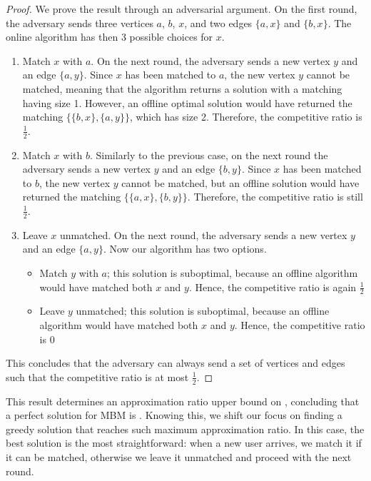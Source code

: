 \documentclass[a4paper, 12pt]{report}
\begin{document}
    \begin{proof}
        We prove the result through an adversarial argument. On the first round, the adversary sends three vertices $a$, $b$, $x$, and two edges $\{a, x\}$ and $\{b, x\}$. The online algorithm has then 3 possible choices for $x$.

        \begin{enumerate}
            \item Match $x$ with $a$. On the next round, the adversary sends a new vertex $y$ and an edge $\{a, y\}$. Since $x$ has been matched to $a$, the new vertex $y$ cannot be matched, meaning that the algorithm returns a solution with a matching having size 1. However, an offline optimal solution would have returned the matching $\{\{b, x\}, \{a, y\}\}$, which has size 2. Therefore, the competitive ratio is $\tfrac{1}{2}$.
            \item Match $x$ with $b$. Similarly to the previous case, on the next round the adversary sends a new vertex $y$ and an edge $\{b, y\}$. Since $x$ has been matched to $b$, the new vertex $y$ cannot be matched, but an offline solution would have returned the matching $\{\{a, x\}, \{b, y\}\}$. Therefore, the competitive ratio is still $\tfrac{1}{2}$.
            \item Leave $x$ unmatched. On the next round, the adversary sends a new vertex $y$ and an edge $\{a, y\}$. Now our algorithm has two options.

                \begin{itemize}
                    \item Match $y$ with $a$; this solution is suboptimal, because an offline algorithm would have matched both $x$ and $y$. Hence, the competitive ratio is again $\tfrac{1}{2}$
                    \item Leave $y$ unmatched; this solution is suboptimal, because an offline algorithm would have matched both $x$ and $y$. Hence, the competitive ratio is 0
                \end{itemize}
        \end{enumerate}

        This concludes that the adversary can always send a set of vertices and edges such that the competitive ratio is at most $\tfrac{1}{2}$.
    \end{proof}

    This result determines an approximation ratio upper bound on , concluding that a perfect solution for MBM is . Knowing this, we shift our focus on finding a greedy solution that reaches such maximum approximation ratio. In this case, the best solution is the most straightforward: when a new user arrives, we match it if it can be matched, otherwise we leave it unmatched and proceed with the next round.
\end{document}
